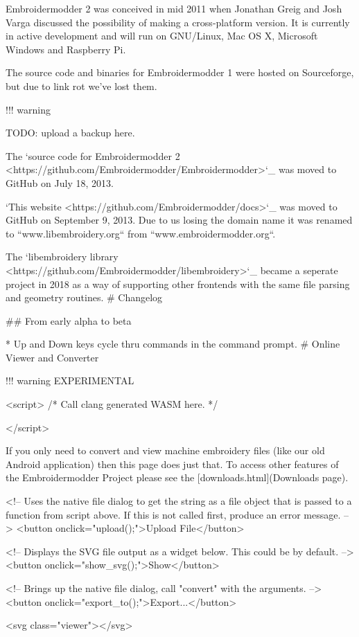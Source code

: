 Embroidermodder 2 was conceived in mid 2011 when Jonathan Greig and Josh Varga
discussed the possibility of making a cross-platform version. It is currently in
active development and will run on GNU/Linux, Mac OS X, Microsoft Windows and
Raspberry Pi.

The source code and binaries for Embroidermodder 1 were hosted on Sourceforge, but
due to link rot we've lost them.

!!! warning

    TODO: upload a backup here.

The `source code for Embroidermodder 2 <https://github.com/Embroidermodder/Embroidermodder>`_
was moved to GitHub on July 18, 2013.

`This website <https://github.com/Embroidermodder/docs>`_ was moved
to GitHub on September 9, 2013. Due to us losing the domain name it was renamed
to ``www.libembroidery.org`` from ``www.embroidermodder.org``.

The `libembroidery library <https://github.com/Embroidermodder/libembroidery>`_
became a seperate project in 2018 as a way of supporting other frontends with
the same file parsing and geometry routines.
# Changelog

## From early alpha to beta

* Up and Down keys cycle thru commands in the command prompt.
# Online Viewer and Converter

!!! warning
    EXPERIMENTAL

<script>
  /* Call clang generated WASM here. */
  
</script>

If you only need to convert and view machine embroidery files (like our old Android application) then this page
does just that. To access other features of the Embroidermodder Project please see the [downloads.html](Downloads page).

<!-- Uses the native file dialog to get the string as a file object that is passed to a function from script above.
     If this is not called first, produce an error message. -->
<button onclick="upload();">Upload File</button>

<!-- Displays the SVG file output as a widget below. This could be by default. -->
<button onclick="show_svg();">Show</button>

<!-- Brings up the native file dialog, call "convert" with the arguments. -->
<button onclick="export_to();">Export...</button>

<svg class="viewer"></svg>

